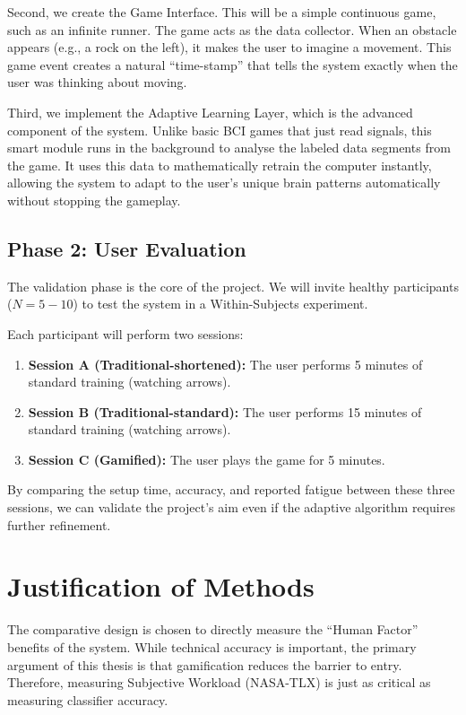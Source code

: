 \documentclass[a4paper, 11pt, openany]{report}
\begin{document}
    Second, we create the Game Interface. This will be a simple continuous 
    game, such as an infinite runner. The game acts as the data collector. 
    When an obstacle appears (e.g., a rock on the left), it makes the user 
    to imagine a movement. This game event creates a natural ``time-stamp'' that 
    tells the system exactly when the user was thinking about moving.
    
    Third, we implement the Adaptive Learning Layer, which is the 
    advanced component of the system. Unlike basic BCI games that just read 
    signals, this smart module runs in the background to analyse the labeled 
    data segments from the game. It uses this data to mathematically retrain 
    the computer instantly, allowing the system to adapt to the user's unique 
    brain patterns automatically without stopping the gameplay.

    \subsection{Phase 2: User Evaluation}
    The validation phase is the core of the project. We will invite healthy 
    participants ($N=5-10$) to test the system in a Within-Subjects experiment.
    
    Each participant will perform two sessions:
    \begin{enumerate}
        \item \textbf{Session A (Traditional-shortened):} The user performs 5 minutes of standard training (watching arrows).
        \item \textbf{Session B (Traditional-standard):} The user performs 15 minutes of standard training (watching arrows).
        \item \textbf{Session C (Gamified):} The user plays the game for 5 minutes.
    \end{enumerate}
    
    By comparing the setup time, accuracy, and reported fatigue 
    between these three sessions, we can validate the project's aim even if the 
    adaptive algorithm requires further refinement.

    \section{Justification of Methods}
    The comparative design is chosen to directly measure the ``Human Factor'' 
    benefits of the system. While technical accuracy is important, the primary 
    argument of this thesis is that gamification reduces the barrier to entry. 
    Therefore, measuring Subjective Workload (NASA-TLX) is just as critical 
    as measuring classifier accuracy. 
    
\end{document}
